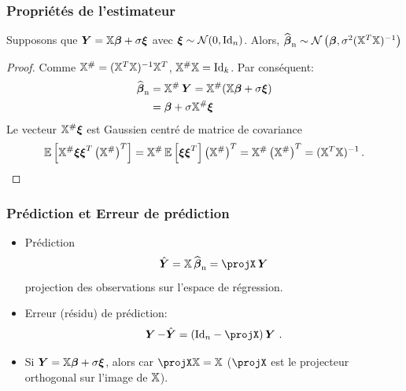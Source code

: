 \begin{frame}
\frametitle{Propriétés de l'estimateur}
\begin{theo}
Supposons que   $\operatorname{\boldsymbol{Y}}= \mathbb{X} \boldsymbol{\beta} + \sigma \boldsymbol{\xi}$ avec $\boldsymbol{\xi} \sim \mathcal{N}(0, \mathrm{Id}_{n})$.
Alors, $\operatorname{\widehat{\boldsymbol{\beta}}_n} \sim \mathcal{N}\left(\boldsymbol{\beta},\sigma^2(\mathbb{X}^T \mathbb{X})^{-1}\right)$
\end{theo}
\begin{proof}
Comme $\mathbb{X}^{\#}= (\mathbb{X}^T \mathbb{X})^{-1} \mathbb{X}^T$, $\mathbb{X}^{\#} \mathbb{X} = \mathrm{Id}_{k}$. Par conséquent:
\begin{align*}
\operatorname{\widehat{\boldsymbol{\beta}}_n}
&= \mathbb{X}^{\#} \operatorname{\boldsymbol{Y}} = \mathbb{X}^{\#} (\mathbb{X} \boldsymbol{\beta} + \sigma \boldsymbol{\xi}) \\
&= \boldsymbol{\beta} + \sigma \mathbb{X}^{\#} \boldsymbol{\xi}
\end{align*}
Le vecteur $\mathbb{X}^{\#} \boldsymbol{\xi}$ est Gaussien centré de matrice de covariance
\[
\operatorname{{\mathbb E}}\left[ \mathbb{X}^{\#} \boldsymbol{\xi} \boldsymbol{\xi}^T \left( \mathbb{X}^{\#} \right)^T \right] =
\mathbb{X}^{\#} \operatorname{{\mathbb E}}\left[ \boldsymbol{\xi} \boldsymbol{\xi}^T \right] \left( \mathbb{X}^{\#} \right)^T  = \mathbb{X}^{\#} \left( \mathbb{X}^{\#} \right)^T = (\mathbb{X}^T \mathbb{X})^{-1} \,.
\]
\end{proof}
\end{frame}


\begin{frame}
\frametitle{Prédiction et Erreur de prédiction}
\begin{itemize}
\item \alert{Prédiction}
\[
\predY= \regressmat \estregress = \projX \bY
\]
projection des observations sur l'espace de régression.
\item \alert{Erreur (résidu) de prédiction}:
\[
\bY - \predY = (\Id{n} - \projX) \bY \eqsp.
\]
\item Si  $\operatorname{\boldsymbol{Y}}= \mathbb{X} \boldsymbol{\beta} +  \sigma \boldsymbol{\xi}$, alors
car $\projX \regressmat= \regressmat$ ($\projX$ est le projecteur orthogonal sur l'image de $\mathbb{X}$).
\end{itemize}
\end{frame}


